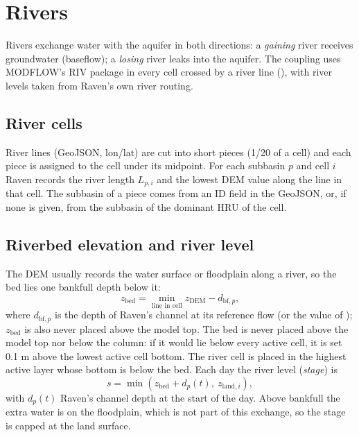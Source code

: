 \section{Rivers}\label{ch:rivers}
Rivers exchange water with the aquifer in both directions: a \emph{gaining} river receives groundwater (baseflow); a
\emph{losing} river leaks into the aquifer. The coupling uses MODFLOW's RIV package in every cell crossed by a river line
(), with river levels taken from Raven's own river routing.

\subsection{River cells}
River lines (GeoJSON, lon/lat) are cut into short pieces (1/20 of a cell) and each piece is assigned to the cell under its
midpoint. For each subbasin $p$ and cell $i$ Raven records the river length $L_{p,i}$ and the lowest DEM value along the
line in that cell. The subbasin of a piece comes from an ID field in the GeoJSON, or, if none is given, from the subbasin
of the dominant HRU of the cell.

\subsection{Riverbed elevation and river level}
The DEM usually records the water surface or floodplain along a river, so the bed lies one bankfull depth below it:
\begin{equation}
z_{\mathrm{bed}}=\min_{\text{line in cell}}z_{\mathrm{DEM}}-d_{\mathrm{bf},p},
\end{equation}
where $d_{\mathrm{bf},p}$ is the depth of Raven's channel at its reference flow (or the value of );
$z_{\mathrm{bed}}$ is also never placed above the model top.
The bed is never placed above the model top nor below the column: if it would lie below every active cell, it is set
0.1 m above the lowest active cell bottom. The river cell is placed in the highest active layer whose bottom is below the
bed. Each day the river level (\emph{stage}) is
\begin{equation}
s=\min\!\left(z_{\mathrm{bed}}+d_p(t),\ z_{\mathrm{land},i}\right),
\end{equation}
with $d_p(t)$ Raven's channel depth at the start of the day. Above bankfull the extra water is on the floodplain, which
is not part of this exchange, so the stage is capped at the land surface.

